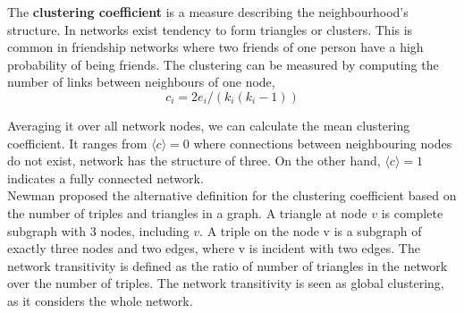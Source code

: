 
The \textbf{clustering coefficient} is a measure describing the neighbourhood's structure. In networks exist tendency to form triangles or clusters. This is common in friendship networks where two friends of one person have a high probability of being friends. The clustering can be measured by computing the number of links between neighbours of one node,
\begin{equation}
c_i=2e_i/(k_i(k_i-1))
\end{equation}

Averaging it over all network nodes, we can calculate the mean clustering coefficient. It ranges from  $\langle c \rangle = 0$ where connections between neighbouring nodes do not exist, network has the structure of three. On the other hand, $\langle c \rangle = 1$ indicates a fully connected network. \\

Newman proposed the alternative definition for the clustering coefficient based on the number of triples and triangles in a graph. A triangle at node $v$ is complete subgraph with 3 nodes, including $v$. A triple on the node v is a subgraph of exactly three nodes and two edges, where v is incident with two edges. The network transitivity is defined as the ratio of number of triangles in the network over the number of triples. The network transitivity is seen as global clustering, as it considers the whole network.  


